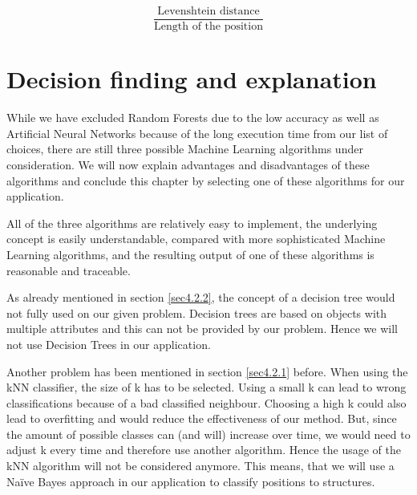 \[
\frac {\text{Levenshtein distance}}{\text{Length of the position}}
\]

\section{Decision finding and explanation}
\label{sec4.3}

While we have excluded Random Forests due to the low accuracy as well as Artificial Neural Networks because of the long execution time from our list of choices, there are still three possible Machine Learning algorithms under consideration. We will now explain advantages and disadvantages of these algorithms and conclude this chapter by selecting one of these algorithms for our application.

All of the three algorithms are relatively easy to implement, the underlying concept is easily understandable, compared with more sophisticated Machine Learning algorithms, and the resulting output of one of these algorithms is reasonable and traceable. 

As already mentioned in section \ref{sec4.2.2}, the concept of a decision tree would not fully used on our given problem. Decision trees are based on objects with multiple attributes and this can not be provided by our problem. Hence we will not use Decision Trees in our application.

Another problem has been mentioned in section \ref{sec4.2.1} before. When using the kNN classifier, the size of k has to be selected. Using a small k can lead to wrong classifications because of a bad classified neighbour. Choosing a high k could also lead to overfitting and would reduce the effectiveness of our method. But, since the amount of possible classes can (and will) increase over time, we would need to adjust k every time and therefore use another algorithm. Hence the usage of the kNN algorithm will not be considered anymore.
This means, that we will use a Na{\"i}ve Bayes approach in our application to classify positions to structures. 